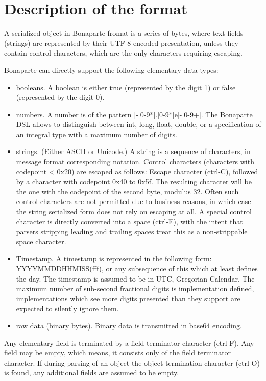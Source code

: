 \documentclass[11pt,a4paper,oneside]{article}
\begin{document}
\section{Description of the format}
A serialized object in Bonaparte fromat is a series of bytes, where text fields
(strings) are represented by their UTF-8 encoded presentation, unless they
contain control characters, which are the only characters requiring escaping.

Bonaparte can directly support the following elementary data types:
\begin{itemize}
\item booleans. A boolean is either true (represented by the digit 1) or false (represented by the digit 0).
\item numbers. A number is of the pattern [-]{0-9}*[.]{0-9}*[e[-]{0-9}+].
The Bonaparte DSL allows to distinguish between int, long, float, double, or a
specification of an integral type with a maximum number of digits.
\item strings. (Either ASCII or Unicode.) A string is a sequence of characters,
in message format corresponding notation. Control characters (characters with
codepoint < 0x20) are escaped as follows: Escape character (ctrl-C), followed by
a character with codepoint 0x40 to 0x5f. The resulting character will be the one
with the codepoint of the second byte, modulus 32. Often such control characters
are not permitted due to business reasons, in which case the string serialized
form does not rely on escaping at all. A special control character is directly
converted into a space (ctrl-E), with the intent that parsers stripping leading
and trailing spaces treat this as a non-strippable space character.
\item Timestamp. A timestamp is represented in the following form:
YYYYMMDDHHMISS(fff), or any subsequence of this which at least defines the
day. The timestamp is assumed to be in UTC, Gregorian Calendar. The maximum
number of sub-second fractional digits is implementation defined,
implementations which see more digits presented than they support are expected to silently ignore them.  
\item raw data (binary bytes). Binary data is transmitted in base64 encoding.
\end{itemize}
Any elementary field is terminated by a field terminator character (ctrl-F). Any
field may be empty, which means, it consists only of the field terminator
character. If during parsing of an object the object termination character
(ctrl-O) is found, any additional fields are assumed to be empty. 
\end{document}
